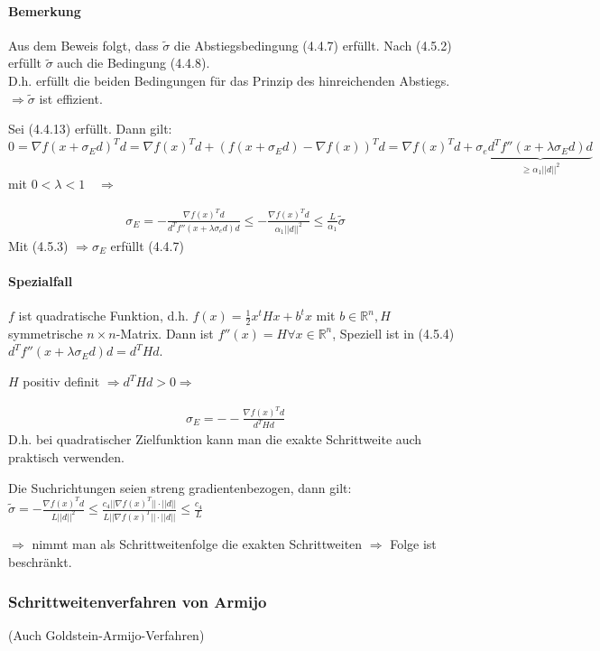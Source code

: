 \documentclass[ngerman,halfparskip]{scrartcl}
\theoremstyle{definition}
\newcommand*{\R}{\mathbb{R}}      %
\begin{document}
\paragraph{Bemerkung} Aus dem Beweis folgt, dass $\tilde \sigma$ die Abstiegsbedingung (4.4.7) erfüllt. Nach (4.5.2) erfüllt $\tilde \sigma$ auch die Bedingung (4.4.8).\\
D.h. erfüllt die beiden Bedingungen für das Prinzip des hinreichenden Abstiegs. \\
$\Rightarrow \tilde \sigma$ ist effizient.

Sei (4.4.13) erfüllt. Dann gilt:
$0=\nabla f(x+\sigma_Ed)^Td=\nabla f(x)^Td + (f(x+\sigma_Ed)-\nabla f(x))^Td=\nabla f(x)^Td+\sigma_e\underbrace{d^Tf''(x+\lambda\sigma_Ed)d}_{\geq \alpha_1||d||^2}$ mit $0<\lambda<1\quad \Rightarrow$

\begin{gather*}\tag{4.5.4}
\sigma_E=-\frac {\nabla f(x)^Td}{d^Tf''(x+\lambda\sigma_e d)d}\leq -\frac{\nabla f(x)^Td}{\alpha_1||d||^2}\leq \frac L{\alpha_1}\tilde \sigma
\end{gather*}
Mit (4.5.3) $\Rightarrow \sigma_E$ erfüllt (4.4.7)

\paragraph*{Spezialfall} $f$ ist quadratische Funktion, d.h. $f(x)=\frac 12 x^tHx+b^tx$ mit $ b\in\R^n, H$ symmetrische $n\times n$-Matrix. Dann ist $f''(x)=H \forall x\in\R^n$, Speziell ist in (4.5.4) $d^Tf''(x+\lambda \sigma_Ed)d=d^THd$.

$H$ positiv definit $\Rightarrow d^THd>0 \Rightarrow$

\begin{gather*}\tag{4.5.5}
\sigma_E=--\frac{\nabla f(x)^Td}{d^THd}
\end{gather*}
D.h. bei quadratischer Zielfunktion kann man die exakte Schrittweite auch praktisch verwenden.

Die Suchrichtungen seien streng gradientenbezogen, dann gilt: \\
$\tilde \sigma =-\frac {\nabla f(x)^Td}{L||d||^2}\leq \frac{c_4 ||\nabla f(x)^T||\cdot||d||}{L||\nabla f(x)^T||\cdot||d||}\leq \frac {c_4}L$

$\Rightarrow$ nimmt man als Schrittweitenfolge die exakten Schrittweiten $\Rightarrow$ Folge ist beschränkt.


\subsubsection{Schrittweitenverfahren von Armijo} 
(Auch Goldstein-Armijo-Verfahren)
\end{document}
